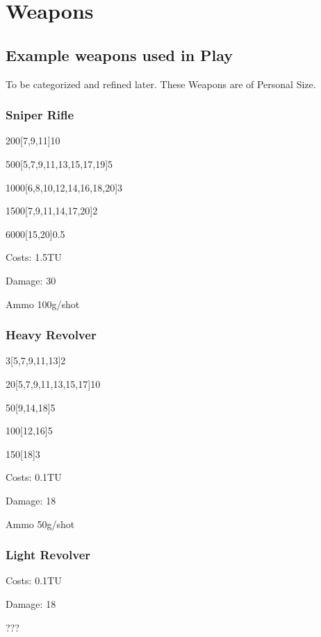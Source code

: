\section{Weapons}\label{sec:weapons}
\subsection{Example weapons used in Play}\label{subsec:example-weapons-used-in-play}
To be categorized and refined later.
These Weapons are of Personal Size.
\subsubsection{Sniper Rifle}
200[7,9,11]10\par
500[5,7,9,11,13,15,17,19]5\par
1000[6,8,10,12,14,16,18,20]3\par
1500[7,9,11,14,17,20]2\par
6000[15,20]0.5\par
Costs: 1.5TU\par
Damage: 30\par
Ammo 100g/shot

\subsubsection{Heavy Revolver}
3[5,7,9,11,13]2\par
20[5,7,9,11,13,15,17]10\par
50[9,14,18]5\par
100[12,16]5\par
150[18]3\par
Costs: 0.1TU\par
Damage: 18\par
Ammo 50g/shot

\subsubsection{Light Revolver}
Costs: 0.1TU\par
Damage: 18\par
???
